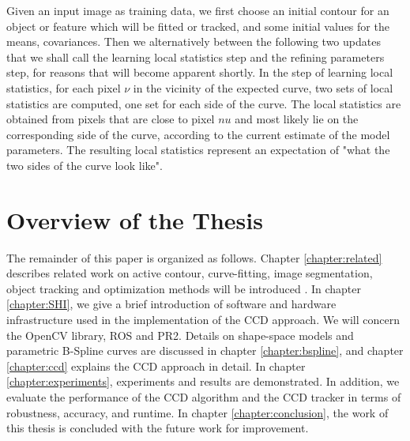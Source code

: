 Given an input image as training data, we first choose an initial
contour for an object or feature which will be fitted or tracked, and
some initial values for the means, covariances. Then we alternatively
between the following two updates that we shall call the learning
local statistics step and the refining parameters step, for reasons
that will become apparent shortly.
In the step of learning local statistics, for each pixel $\nu$ in the
vicinity of the expected curve, two sets of local statistics
are computed, one set for each side of the curve. The local statistics are obtained from
pixels that are close to pixel $nu$ and most likely lie on the corresponding side of the curve,
according to the current estimate of the model parameters. The resulting local statistics
represent an expectation of "what the two sides of the curve look
like"\cite{hanek2004contracting}.



\section{Overview of the Thesis}
\label{sec:overview}
The remainder of this paper is organized as
follows. Chapter \ref{chapter:related} describes related work on active contour,
curve-fitting, image segmentation, object tracking and optimization methods will be
introduced . In chapter \ref{chapter:SHI}, we give a brief introduction of software
and hardware infrastructure used in the implementation of the CCD
approach. We will concern the OpenCV library, ROS and PR2. Details on shape-space models and parametric
B-Spline curves are discussed in chapter \ref{chapter:bspline},  and
chapter \ref{chapter:ccd} explains the CCD approach in detail. 
In chapter \ref{chapter:experiments}, experiments and results are demonstrated. In
addition, we evaluate the performance of the CCD algorithm and the CCD
tracker in terms of robustness, accuracy, and runtime. In chapter \ref{chapter:conclusion},
the work of this thesis is concluded with the future work for improvement.



